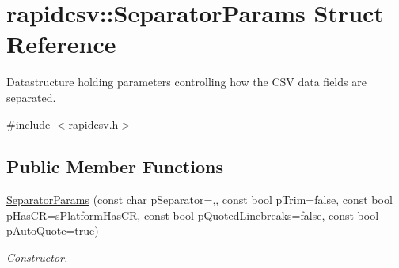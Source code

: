 \hypertarget{structrapidcsv_1_1SeparatorParams}{}\section{rapidcsv\+:\+:Separator\+Params Struct Reference}
\label{structrapidcsv_1_1SeparatorParams}


Datastructure holding parameters controlling how the C\+SV data fields are separated.  




{\ttfamily \#include $<$rapidcsv.\+h$>$}

\subsection*{Public Member Functions}
\begin{DoxyCompactItemize}
\item 
\hyperlink{structrapidcsv_1_1SeparatorParams_a663909f2406ab233f49f1edea25be505}{Separator\+Params} (const char p\+Separator=\textquotesingle{},\textquotesingle{}, const bool p\+Trim=false, const bool p\+Has\+CR=s\+Platform\+Has\+CR, const bool p\+Quoted\+Linebreaks=false, const bool p\+Auto\+Quote=true)
\begin{DoxyCompactList}\small\item\em Constructor. \end{DoxyCompactList}\end{DoxyCompactItemize}
